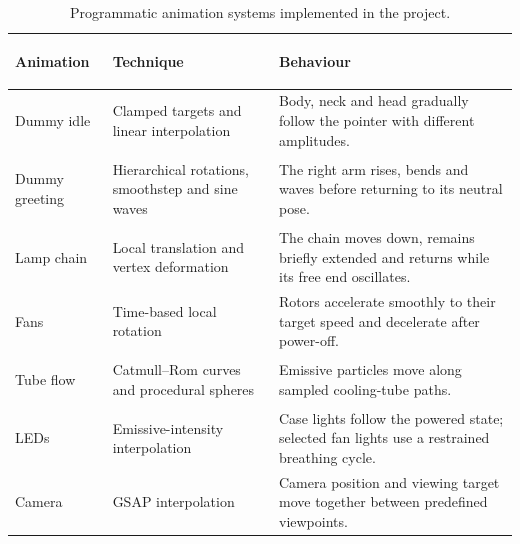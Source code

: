 \documentclass{report}
\begin{document}
\begin{table}[ht]
    \centering
    \footnotesize
    \setlength{\tabcolsep}{5pt}
    \renewcommand{\arraystretch}{1.2}

    \begin{tabularx}{\textwidth}{
        @{}
        >{\bfseries\raggedright\arraybackslash}p{}
        >{\raggedright\arraybackslash}p{}
        >{\raggedright\arraybackslash}X
        @{}
    }
        \toprule
        Animation & Technique & Behaviour \\
        \midrule

        Dummy idle
        &
        Clamped targets and linear interpolation
        &
        Body, neck and head gradually follow the pointer with different
        amplitudes.
        \\

        Dummy greeting
        &
        Hierarchical rotations, smoothstep and sine waves
        &
        The right arm rises, bends and waves before returning to its
        neutral pose.
        \\

        Lamp chain
        &
        Local translation and vertex deformation
        &
        The chain moves down, remains briefly extended and returns while
        its free end oscillates.
        \\

        Fans
        &
        Time-based local rotation
        &
        Rotors accelerate smoothly to their target speed and decelerate
        after power-off.
        \\

        Tube flow
        &
        Catmull--Rom curves and procedural spheres
        &
        Emissive particles move along sampled cooling-tube paths.
        \\

        LEDs
        &
        Emissive-intensity interpolation
        &
        Case lights follow the powered state; selected fan lights use a
        restrained breathing cycle.
        \\

        Camera
        &
        GSAP interpolation
        &
        Camera position and viewing target move together between
        predefined viewpoints.
        \\

        \bottomrule
    \end{tabularx}

    \caption{Programmatic animation systems implemented in the project.}
    \label{tab:programmatic-animations}
\end{table}
\end{document}
